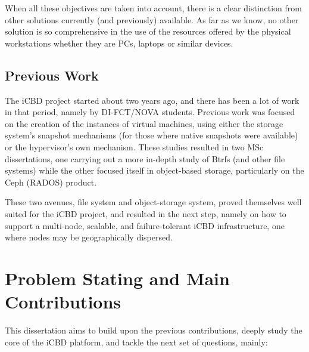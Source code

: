 When all these objectives are taken into account, there is a clear distinction from other solutions currently (and previously) available. As far as we know, no other solution is so comprehensive in the use of the resources offered by the physical workstations whether they are PCs, laptops or similar devices.


\subsection{Previous Work} %
\label{sub:intro_previous_work}

The iCBD project started about two years ago, and there has been a lot of work in that period, namely by DI-FCT/NOVA students. Previous work was focused on the creation of the instances of virtual machines, using either the storage system’s snapshot mechanisms (for those where native snapshots were available) or the hypervisor’s own mechanism. These studies resulted in two MSc dissertations, one carrying out a more in-depth study of Btrfs (and other file systems) while the other focused itself in object-based storage, particularly on the Ceph (RADOS) product.

These two avenues, file system and object-storage system, proved themselves well suited for the iCBD project, and resulted in the next step, namely on how to support a multi-node, scalable, and failure-tolerant iCBD infrastructure, one where nodes may be geographically dispersed.



\section{Problem Stating and Main Contributions}
\label{sec:intro_project_contributions}

This dissertation aims to build upon the previous contributions, deeply study the core of the iCBD platform, and tackle the next set of questions, mainly:

